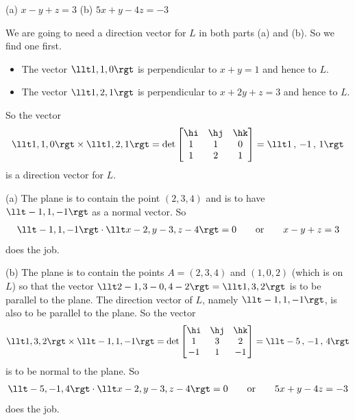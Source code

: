 %

\begin{answer}
(a) $x-y+z=3$\qquad
(b) $5x+y-4z=-3$
\end{answer}

\begin{solution}
We are going to need a direction vector for $L$ in both parts (a) and (b).
So we find one first.
\begin{itemize}
\item
The vector $\llt 1,1,0\rgt$ is perpendicular to $x + y = 1$
and hence to $L$.
\item
The vector $\llt 1,2,1\rgt$ is perpendicular to $x + 2y + z = 3$
and hence to $L$. 
\end{itemize}
So the vector
\begin{align*}
\llt 1,1,0\rgt \times \llt 1,2,1\rgt
    =\det\left[\begin{matrix}
            \hi  &  \hj  &  \hk \\
            1    &   1   &   0 \\
            1    &   2   &    1 
            \end{matrix}\right]
=\llt 1 \,,\, -1 \,,\, 1 \rgt
\end{align*}
is a direction vector for $L$.

(a) The plane is to contain the point $(2,3,4)$ and is to have 
$\llt-1,1,-1 \rgt$ as a normal vector. So
\begin{align*}
\llt-1,1,-1 \rgt\cdot \llt x-2,y-3,z-4 \rgt =0\qquad\text{or}\qquad
x-y+z=3
\end{align*}
does the job.

(b) The plane is to contain the points $A=(2,3,4)$ and $(1,0,2)$
(which is on $L$) so that the vector $ \llt 2-1,3-0,4-2 \rgt
=\llt 1,3,2 \rgt$ is to be parallel to the plane. The direction
vector of $L$, namely $\llt -1 , 1 , -1 \rgt$, is also to be parallel 
to the plane. So the vector 
\begin{align*}
\llt 1,3,2\rgt \times \llt -1,1,-1\rgt
    =\det\left[\begin{matrix}
            \hi  &  \hj  &  \hk \\
            1    &   3   &   2 \\
            -1   &   1   &  -1 
            \end{matrix}\right]
=\llt -5 \,,\, -1 \,,\, 4 \rgt
\end{align*}
is to be normal to the plane. So
\begin{align*}
\llt-5,-1,4 \rgt\cdot \llt x-2,y-3,z-4 \rgt =0\qquad\text{or}\qquad
5x+y-4z=-3
\end{align*}
does the job.
\end{solution}

